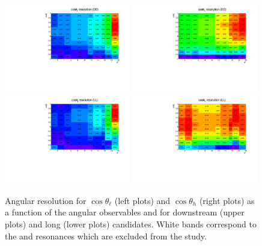 \begin{figure}
\centering
\includegraphics[width=0.49\textwidth]{Lmumu/figs/resolution/resolution2D_cosThetaL_DD.pdf}
\includegraphics[width=0.49\textwidth]{Lmumu/figs/resolution/resolution2D_cosThetaB_DD.pdf} \\
\includegraphics[width=0.49\textwidth]{Lmumu/figs/resolution/resolution2D_cosThetaL_LL.pdf}
\includegraphics[width=0.49\textwidth]{Lmumu/figs/resolution/resolution2D_cosThetaB_LL.pdf}
\caption{Angular resolution for $\cos \theta_\ell$ (left plots) and  $\cos \theta_h$ (right plots)
as a function of the angular observables and \qsq for downstream (upper plots) and
long (lower plots) candidates. White bands correspond to the \jpsi and \psitwos resonances
which are excluded from the study.}
\label{fig:avgResol}
\end{figure}


